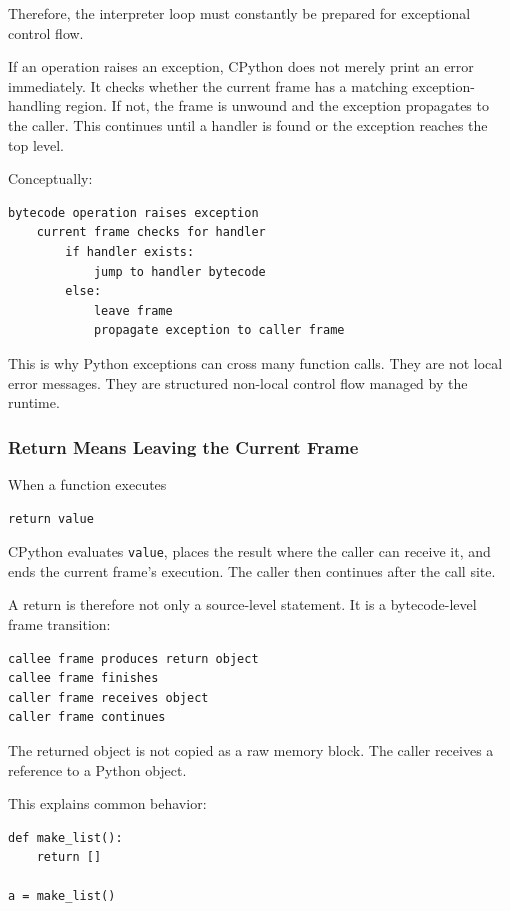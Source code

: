 Therefore, the interpreter loop must constantly be prepared for exceptional control flow.

If an operation raises an exception, CPython does not merely print an error immediately. It checks whether the current frame has a matching exception-handling region. If not, the frame is unwound and the exception propagates to the caller. This continues until a handler is found or the exception reaches the top level.

Conceptually:

\begin{verbatim}
bytecode operation raises exception
    current frame checks for handler
        if handler exists:
            jump to handler bytecode
        else:
            leave frame
            propagate exception to caller frame
\end{verbatim}

This is why Python exceptions can cross many function calls. They are not local error messages. They are structured non-local control flow managed by the runtime.

\subsubsection{Return Means Leaving the Current Frame}

When a function executes

\begin{verbatim}
return value
\end{verbatim}

CPython evaluates \texttt{value}, places the result where the caller can receive it, and ends the current frame's execution. The caller then continues after the call site.

A return is therefore not only a source-level statement. It is a bytecode-level frame transition:

\begin{verbatim}
callee frame produces return object
callee frame finishes
caller frame receives object
caller frame continues
\end{verbatim}

The returned object is not copied as a raw memory block. The caller receives a reference to a Python object.

This explains common behavior:

\begin{verbatim}
def make_list():
    return []

a = make_list()
\end{verbatim}

